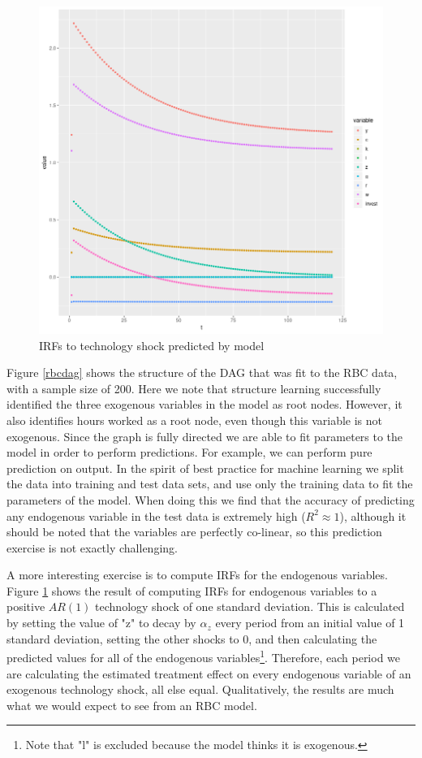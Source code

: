 \documentclass{article}
\begin{document}
\begin{figure}
\centering
\label{rbcirf}
\includegraphics[width=\textwidth, height=0.4\textheight, keepaspectratio]{images/rbc_irf_ar1.png}
\caption{IRFs to technology shock predicted by model}
\end{figure}

Figure \ref{rbcdag} shows the structure of the DAG that was fit to the RBC data, with a sample size of 200. Here we note that structure learning successfully identified the three exogenous variables in the model as root nodes. However, it also identifies hours worked as a root node, even though this variable is not exogenous. Since the graph is fully directed we are able to fit parameters to the model in order to perform predictions. For example, we can perform pure prediction on output. In the spirit of best practice for machine learning we split the data into training and test data sets, and use only the training data to fit the parameters of the model. When doing this we find that the accuracy of predicting any endogenous variable in the test data is extremely high ($R^2 \approx 1$), although it should be noted that the variables are perfectly co-linear, so this prediction exercise is not exactly challenging. 

A more interesting exercise is to compute IRFs for the endogenous variables. Figure \ref{rbcirf} shows the result of computing IRFs for endogenous variables to a positive $AR(1)$ technology shock of one standard deviation. This is calculated by setting the value of "z" to decay by $\alpha_z$ every period from an initial value of 1 standard deviation, setting the other shocks to 0, and then calculating the predicted values for all of the endogenous variables\footnote{Note that "l" is excluded because the model thinks it is exogenous.}. Therefore, each period we are calculating the estimated treatment effect on every endogenous variable of an exogenous technology shock, all else equal. Qualitatively, the results are much what we would expect to see from an RBC model. 
\end{document}
